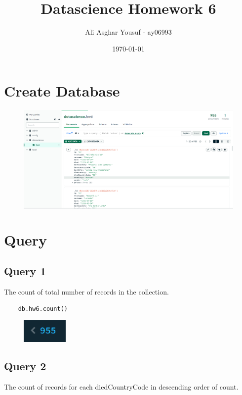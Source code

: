 \documentclass{article}
\title{Datascience Homework 6}
\author{Ali Asghar Yousuf - ay06993}
\date{\today}
\begin{document}
\maketitle

\section{Create Database}
\begin{figure}[H]
    \includegraphics[width=\textwidth]{images/createdb.png}
\end{figure}

\section{Query}
\subsection{Query 1}
The count of total number of records in the collection.

\begin{multicols*}{2}
    \begin{verbatim}
    db.hw6.count()
\end{verbatim}
    \columnbreak

    \begin{figure}[H]
        \includegraphics[width=0.2\textwidth]{images/q1.png}
    \end{figure}
\end{multicols*}

\subsection{Query 2}
The count of records for each diedCountryCode in descending order of count.
\end{document}
